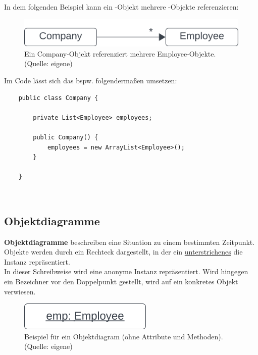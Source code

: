 \noindent
In dem folgenden Beispiel kann ein -Objekt mehrere -Objekte referenzieren:

\begin{figure}
    \centering
    \includegraphics[scale=0.5]{chapters/fopt3/img/multipleemployees}
    \caption{Ein Company-Objekt referenziert mehrere Employee-Objekte. (Quelle: eigene)}
    \label{fig:multipleemployees}
\end{figure}

Im Code lässt sich das bspw. folgendermaßen umsetzen:
\newpage

\begin{verbatim}
    public class Company {

        private List<Employee> employees;

        public Company() {
            employees = new ArrayList<Employee>();
        }

    }
\end{verbatim}\\

\subsection{Objektdiagramme}

\textbf{Objektdiagramme} beschreiben eine Situation zu einem bestimmten Zeitpunkt.\\

\noindent
Objekte werden durch ein Rechteck dargestellt, in der ein \ul{unterstrichenes} \code{:[Klassenname]} die Instanz repräsentiert. \\
In dieser Schreibweise wird eine anonyme Instanz repräsentiert.
Wird hingegen ein Bezeichner vor den Doppelpunkt gestellt, wird auf ein konkretes Objekt verwiesen.\\

\begin{figure}
    \centering
    \includegraphics[scale=0.5]{chapters/fopt3/img/objectdiagram}
    \caption{Beispiel für ein Objektdiagram (ohne Attribute und Methoden). (Quelle: eigene)}
    \label{fig:objectdiagram}
\end{figure}

